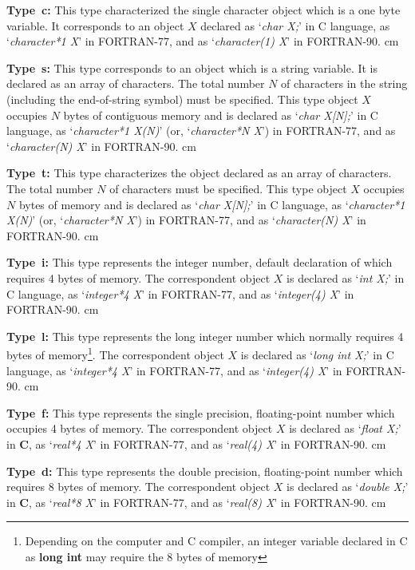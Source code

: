 {\bf Type\ c:}\hfil\break
This type characterized the single character object 
which is a one byte variable.
It corresponds to an object $X$ declared as 
`{\it char X;}' in C language,
as `{\it character*1 X}' in FORTRAN-77, 
and as `{\it character(1) X}' in FORTRAN-90.
 cm

{\bf Type\ s:}\hfil\break
This type corresponds to an object which is a string variable.
It is declared as an array of characters.
The total number $N$ of characters in the string
(including the end-of-string symbol)
must be specified.
This type object $X$ occupies $N$ bytes of contiguous memory
and is declared  as `{\it char X[N];}' in C language,
as `{\it character*1 X(N)}' (or, `{\it character*N X}') in FORTRAN-77,
and as `{\it character(N) X}' in FORTRAN-90.
 cm

{\bf Type\ t:}\hfil\break
This type characterizes the object declared as an array of characters.
The total number $N$ of characters must be specified.
This type object $X$ occupies $N$ bytes of memory
and is declared as `{\it char X[N];}' in C language,
as `{\it character*1 X(N)}' (or, `{\it character*N X}') in FORTRAN-77,
and as `{\it character(N) X}' in FORTRAN-90.
 cm

{\bf Type\ i:}\hfil\break
This type represents the integer number,
default declaration of which requires 4 bytes of memory.
The correspondent object $X$ is declared as
`{\it int X;}' in C language,
as `{\it integer*4 X}' in FORTRAN-77, 
and as `{\it integer(4) X}' in FORTRAN-90.
 cm

{\bf Type\ l:}\hfil\break
This type represents the long integer number which
normally requires 4 bytes of memory\footnote{
Depending on the computer and C compiler, 
an integer variable declared in C as {\bf long int}
may require the 8 bytes of memory}.
The correspondent object $X$ is declared as
`{\it long int X;}' in C language,
as `{\it integer*4 X}' in FORTRAN-77, 
and as `{\it integer(4) X}' in FORTRAN-90.
 cm

{\bf Type\ f:}\hfil\break
This type represents the single precision, floating-point number
which occupies 4 bytes of memory.
The correspondent object $X$ is declared as `{\it float X;}' in {\bf C},
as `{\it real*4 X}' in FORTRAN-77, 
and as `{\it real(4) X}' in FORTRAN-90.
 cm

{\bf Type\ d:}\hfil\break
This type represents the double precision, floating-point number
which requires 8 bytes of memory.
The correspondent object $X$ is declared as `{\it double X;}' in {\bf C},
as `{\it real*8 X}' in FORTRAN-77, 
and as `{\it real(8) X}' in FORTRAN-90.
 cm

